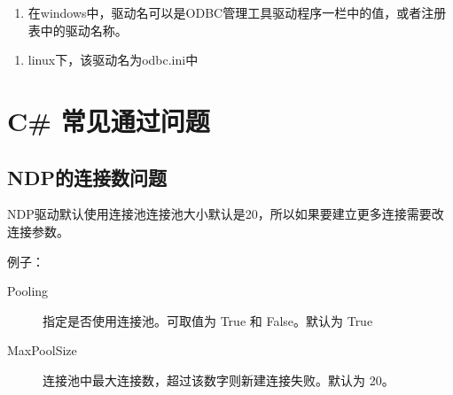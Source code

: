 \documentclass[letterpaper,10pt,english]{sphinxmanual}
\begin{document}
\begin{sphinxVerbatim}[commandchars=\\\{\}]
\end{sphinxVerbatim}
\begin{enumerate}
%
\item {} 
在windows中，驱动名可以是ODBC管理工具驱动程序一栏中的值，或者注册表中的驱动名称。

\end{enumerate}

\begin{figure}[htbp]
\centering

\noindent{}
\end{figure}
\begin{enumerate}
%
\setcounter{enumi}{1}
\item {} 
linux下，该驱动名为odbc.ini中

\end{enumerate}

\begin{figure}[htbp]
\centering

\noindent{}
\end{figure}


\section{C\# 常见通过问题}
\label{\detokenize{interface/C_:c}}\label{\detokenize{interface/C_::doc}}

\subsection{NDP的连接数问题}
\label{\detokenize{interface/C_:ndp}}
NDP驱动默认使用连接池连接池大小默认是20，所以如果要建立更多连接需要改连接参数。

例子：
\begin{description}
\item[{Pooling}] \leavevmode
指定是否使用连接池。可取值为 True 和 False。默认为 True

\item[{MaxPoolSize}] \leavevmode
连接池中最大连接数，超过该数字则新建连接失败。默认为 20。

\end{description}
\end{document}
